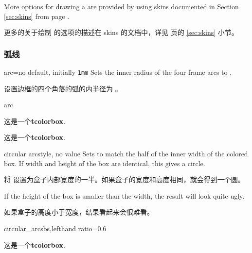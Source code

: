   \bigskip
  \begin{marker}
  More options for drawing a  are provided by using skins documented in
  Section \ref{sec:skins} from page \pageref{sec:skins}.
  
  更多的关于绘制  的选项的描述在 skins 的文档中，详见 \pageref{sec:skins} 页的 \ref{sec:skins} 小节。
  \end{marker}



\subsubsection{弧线}
\begin{docTcbKey}{arc}{=}{no default, initially \texttt{1mm}}
Sets the inner radius of the four frame arcs to .

设置边框的四个角落的弧的内半径为 。
\begin{exdispExample}{arc}

\begin{tcolorbox}[arc=0mm]
这是一个\textbf{tcolorbox}.
\end{tcolorbox}
\begin{tcolorbox}[arc=3mm]
这是一个\textbf{tcolorbox}.
\end{tcolorbox}
\end{exdispExample}
\end{docTcbKey}


\begin{docTcbKey}[][doc new=2015-05-05]{circular arc}{}{style, no value}
  Sets  to match the half of the inner width of the colored box.
  If width and height of the box are identical, this gives a circle.
  
  将  设置为盒子内部宽度的一半。如果盒子的宽度和高度相同，就会得到一个圆。
  \begin{marker}
  If the height of the box is smaller than the width, the result will look
  quite ugly.
  
  如果盒子的高度小于宽度，结果看起来会很难看。   
  \end{marker}
  \begin{exdispExample*}{circular_arc}{sbs,lefthand ratio=0.6}
  \begin{tcolorbox}[width=3cm,
  colback=red!5!white,
  colframe=red!75!black,
  halign=center,valign=center,
  square,circular arc]
  这是一个\textbf{tcolorbox}.
  \end{tcolorbox}
  \end{exdispExample*}
  \end{docTcbKey}
  
